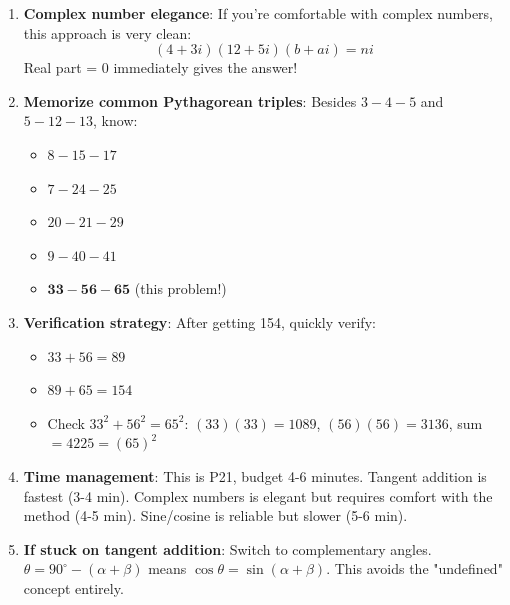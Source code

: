 \documentclass[12pt]{article}
\begin{document}
\begin{tipbox}
\begin{enumerate}
    \item \textbf{Complex number elegance}: If you're comfortable with complex numbers, this approach is very clean:
    $$(4 + 3i)(12 + 5i)(b + ai) = ni$$
    Real part = 0 immediately gives the answer!
    
    \item \textbf{Memorize common Pythagorean triples}: Besides $3-4-5$ and $5-12-13$, know:
    \begin{itemize}
        \item $8-15-17$
        \item $7-24-25$
        \item $20-21-29$
        \item $9-40-41$
        \item $\mathbf{33-56-65}$ (this problem!)
    \end{itemize}
    
    \item \textbf{Verification strategy}: After getting 154, quickly verify:
    \begin{itemize}
        \item $33 + 56 = 89$
        \item $89 + 65 = 154$ \checkmark
        \item Check $33^2 + 56^2 = 65^2$: $(33)(33) = 1089$, $(56)(56) = 3136$, sum $= 4225 = (65)^2$ \checkmark
    \end{itemize}
    
    \item \textbf{Time management}: This is P21, budget 4-6 minutes. Tangent addition is fastest (3-4 min). Complex numbers is elegant but requires comfort with the method (4-5 min). Sine/cosine is reliable but slower (5-6 min).
    
    \item \textbf{If stuck on tangent addition}: Switch to complementary angles. $\theta = 90^{\circ} - (\alpha + \beta)$ means $\cos\theta = \sin(\alpha + \beta)$. This avoids the "undefined" concept entirely.
\end{enumerate}
\end{tipbox}
\end{document}
